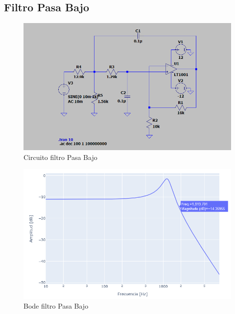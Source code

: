 \subsection{Filtro Pasa Bajo}

\begin{figure}[H]
    \centering
    \includegraphics[width=1.0\linewidth]{figuras/pasabajocircuito.png}
    \caption{Circuito filtro Pasa Bajo}
\end{figure}
\begin{figure}[H]
    \centering
    \includegraphics[width=1.0\linewidth]{figuras/diagramas/pasa_bajo_amp.png}
    \caption{Bode filtro Pasa Bajo}
\end{figure}

